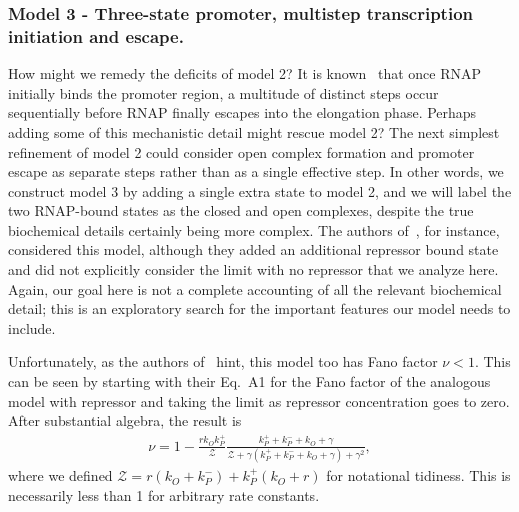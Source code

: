 \documentclass[12pt]{article}%
\begin{document}
\subsubsection{Model 3 - Three-state promoter, multistep
transcription initiation and escape.}
How might we remedy the deficits of model 2?
It is known~\cite{DeHaseth1998} that once RNAP initially binds
the promoter region, a multitude of distinct steps occur
sequentially before RNAP finally escapes into the elongation
phase. Perhaps adding some of this mechanistic detail might
rescue model 2? The next simplest refinement of model 2 could
consider open complex formation and promoter escape as separate
steps rather than as a single effective step. In other words, we
construct model 3 by adding a single extra state to model 2, and
we will label the two RNAP-bound states as the closed and open
complexes, despite the true biochemical details certainly being
more complex. The authors of~\cite{Mitarai2015}, for instance,
considered this model, although they added an additional
repressor bound state and did not explicitly consider the limit
with no repressor that we analyze here. Again, our goal here is
not a complete accounting of all the relevant biochemical detail;
this is an exploratory search for the important features our
model needs to include.

Unfortunately, as the authors of~\cite{Mitarai2015} hint, this
model too has Fano factor $\nu<1$. This can be seen by starting
with their Eq.~A1 for the Fano factor of the analogous model with
repressor and taking the limit as repressor concentration goes to
zero. After substantial algebra, the result is
\begin{align}
\nu = 1 - \frac{r k_O k_P^+}{\mathcal{Z}}
\frac{k_P^+ + k_P^- + k_O + \gamma}
        {\mathcal{Z} + \gamma(k_P^+ + k_P^- + k_O + \gamma) + \gamma^2},
\end{align}
where we defined $\mathcal{Z} = r(k_O + k_P^-) + k_P^+(k_O + r)$
for notational tidiness. This is necessarily less than 1 for
arbitrary rate constants.
\end{document}

